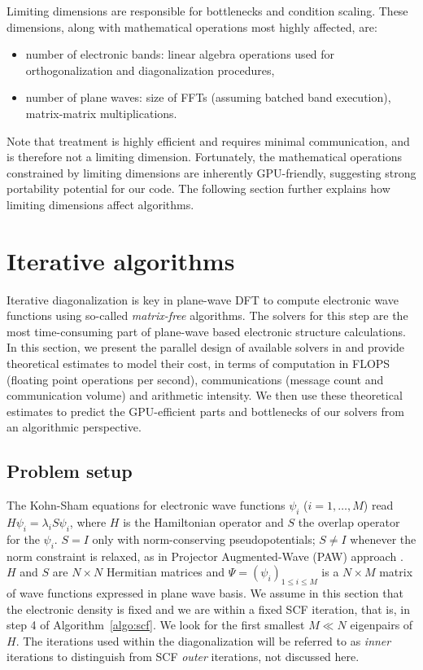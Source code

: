 \documentclass[twocolumn,superscriptaddress]{revtex4-1}
\begin{document}
Limiting dimensions are responsible for bottlenecks and condition scaling. These dimensions, along with mathematical operations most highly affected, are:
\begin{itemize}
    \item number of electronic bands: linear algebra operations used for orthogonalization and diagonalization procedures,
    \item number of plane waves: size of FFTs (assuming batched band execution), matrix-matrix multiplications.
\end{itemize}

Note that \kpoint treatment is highly efficient and requires minimal communication, and is therefore not a limiting dimension. Fortunately, the mathematical operations constrained by limiting dimensions are inherently GPU-friendly, suggesting strong portability potential for our code. The following section further explains how limiting dimensions affect algorithms.

\section{Iterative algorithms}\label{sec:iterative}

Iterative diagonalization is key in plane-wave DFT to compute electronic wave functions using so-called \textit{matrix-free} algorithms. The solvers for this step are the most time-consuming part of plane-wave based electronic structure calculations. In this section, we present the parallel design of available solvers in \abinit and provide theoretical estimates to model their cost, in terms of computation in FLOPS (floating point operations per second), \mpi communications (message count and communication volume) and arithmetic intensity. We then use these theoretical estimates to predict the GPU-efficient parts and bottlenecks of our solvers from an algorithmic perspective.

\subsection{Problem setup}

The Kohn-Sham equations for electronic wave functions $\psi_i$ ($i=1,\ldots,M$) read $H\psi_i = \lambda_i S\psi_i$, where $H$ is the Hamiltonian operator and $S$ the overlap operator for the $\psi_i$. $S = I$ only with norm-conserving pseudopotentials; $S \neq I$ whenever the norm constraint is relaxed, as in Projector Augmented-Wave (PAW) approach \cite{Blochl1994}. $H$ and $S$ are $N\times N$ Hermitian matrices and $\Psi=(\psi_i)_{1\leq i\leq M}$ is a $N\times M$ matrix of wave functions expressed in plane wave basis. We assume in this section that the electronic density is fixed and we are within a fixed SCF iteration, that is, in step 4 of Algorithm~\ref{algo:scf}. We look for the first smallest $M\ll N$ eigenpairs of $H$. The iterations used within the diagonalization will be referred to as \textit{inner} iterations to distinguish from SCF \textit{outer} iterations, not discussed here.
\end{document}
